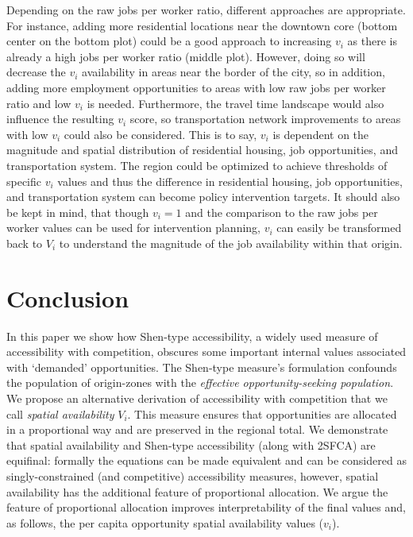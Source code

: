 \documentclass[10pt,letterpaper]{article}
\begin{document}
Depending on the raw jobs per worker ratio, different approaches are
appropriate. For instance, adding more residential locations near the
downtown core (bottom center on the bottom plot) could be a good
approach to increasing \(v_i\) as there is already a high jobs per
worker ratio (middle plot). However, doing so will decrease the \(v_i\)
availability in areas near the border of the city, so in addition,
adding more employment opportunities to areas with low raw jobs per
worker ratio and low \(v_i\) is needed. Furthermore, the travel time
landscape would also influence the resulting \(v_i\) score, so
transportation network improvements to areas with low \(v_i\) could also
be considered. This is to say, \(v_i\) is dependent on the magnitude and
spatial distribution of residential housing, job opportunities, and
transportation system. The region could be optimized to achieve
thresholds of specific \(v_i\) values and thus the difference in
residential housing, job opportunities, and transportation system can
become policy intervention targets. It should also be kept in mind, that
though \(v_i = 1\) and the comparison to the raw jobs per worker values
can be used for intervention planning, \(v_i\) can easily be transformed
back to \(V_i\) to understand the magnitude of the job availability
within that origin.

\newpage

\hypertarget{conclusion}{%
\section{Conclusion}\label{conclusion}}

In this paper we show how Shen-type accessibility, a widely used measure
of accessibility with competition, obscures some important internal
values associated with `demanded' opportunities. The Shen-type measure's
formulation confounds the population of origin-zones with the
\emph{effective opportunity-seeking population}. We propose an
alternative derivation of accessibility with competition that we call
\emph{spatial availability} \(V_i\). This measure ensures that
opportunities are allocated in a proportional way and are preserved in
the regional total. We demonstrate that spatial availability and
Shen-type accessibility (along with 2SFCA) are equifinal: formally the
equations can be made equivalent and can be considered as
singly-constrained (and competitive) accessibility measures, however,
spatial availability has the additional feature of proportional
allocation. We argue the feature of proportional allocation improves
interpretability of the final values and, as follows, the per capita
opportunity spatial availability values (\(v_i\)).
\end{document}
